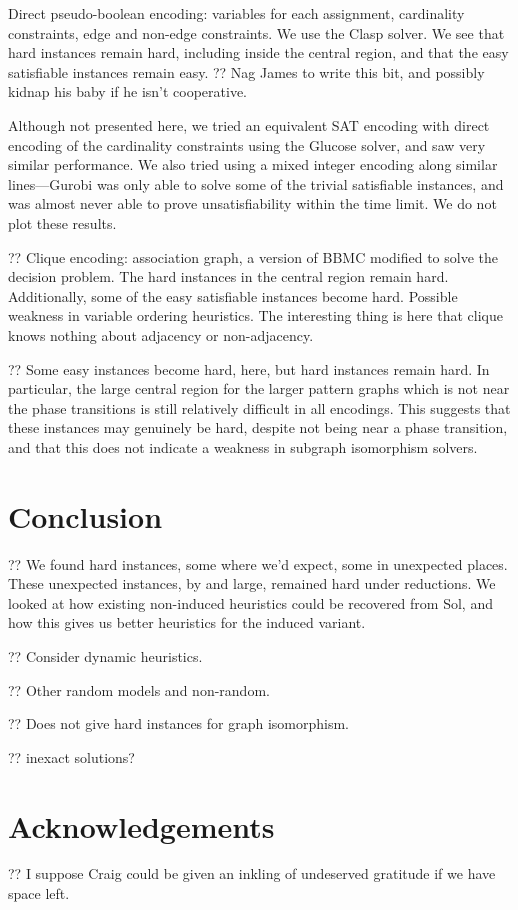 \documentclass[letterpaper]{article}
\begin{document}
Direct pseudo-boolean encoding: variables for each assignment, cardinality constraints, edge and
non-edge constraints. We use the Clasp solver. We see that hard instances remain hard, including
inside the central region, and that the easy satisfiable instances remain easy. ?? Nag James to
write this bit, and possibly kidnap his baby if he isn't cooperative.

Although not presented here, we tried an equivalent SAT encoding with direct encoding of the
cardinality constraints using the Glucose solver, and saw very similar performance.  We also tried
using a mixed integer encoding along similar lines---Gurobi was only able to solve some of the
trivial satisfiable instances, and was almost never able to prove unsatisfiability within the time
limit. We do not plot these results.

?? Clique encoding: association graph, a version of BBMC \citep{SanSegundo:2011} modified to solve the
decision problem. The hard instances in the central region remain hard. Additionally, some of the
easy satisfiable instances become hard. Possible weakness in variable ordering heuristics. The
interesting thing is here that clique knows nothing about adjacency or non-adjacency.

?? Some easy instances become hard, here, but hard instances remain hard. In particular, the large
central region for the larger pattern graphs which is not near the phase transitions is still
relatively difficult in all encodings. This suggests that these instances may genuinely be hard,
despite not being near a phase transition, and that this does not indicate a weakness in subgraph
isomorphism solvers.

\section{Conclusion}

?? We found hard instances, some where we'd expect, some in unexpected places. These unexpected
instances, by and large, remained hard under reductions. We looked at how existing non-induced
heuristics could be recovered from Sol, and how this gives us better heuristics for the induced
variant.

?? Consider dynamic heuristics.

?? Other random models and non-random.

?? Does not give hard instances for graph isomorphism.

?? \citep{Lipets:2009} inexact solutions?

\section*{Acknowledgements}

?? I suppose Craig could be given an inkling of undeserved gratitude if we have space left.



\end{document}
